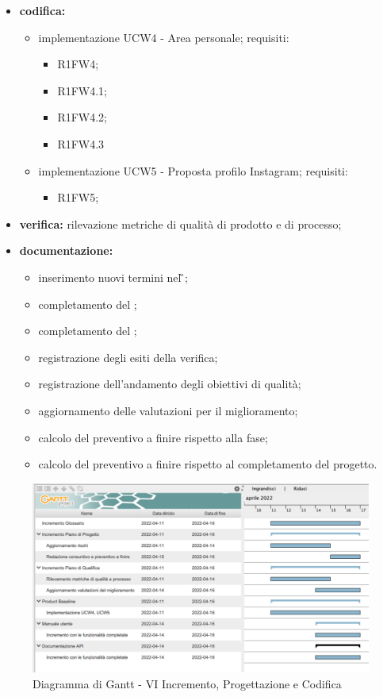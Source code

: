 \begin{itemize}
	\item \textbf{codifica:} 
			\begin{itemize}
				\item implementazione UCW4 - Area personale; requisiti:
					\begin{itemize}
						\item R1FW4;
      					\item R1FW4.1;
           				\item R1FW4.2;
               			\item R1FW4.3
					\end{itemize}
				\item implementazione UCW5 - Proposta profilo Instagram; requisiti:
					\begin{itemize}
						\item R1FW5;
					\end{itemize}
			\end{itemize}
 	\item \textbf{verifica:} rilevazione metriche di qualità di prodotto e di processo;
	\item \textbf{documentazione:} 
	 \begin{itemize}
		\item inserimento nuovi termini nel \G{};
		\item completamento del \MU{};
		\item completamento del \MS{};
  		\item registrazione degli esiti della verifica;
     	\item registrazione dell’andamento degli obiettivi di qualità;
		\item aggiornamento delle valutazioni per il miglioramento; 
		\item calcolo del preventivo a finire rispetto alla fase;
		\item calcolo del preventivo a finire rispetto al completamento del progetto.
	 \end{itemize}
\end{itemize}
\begin{figure}[H]
	\centering
	\includegraphics[scale=0.45]{Sezioni/gantt/VI_incremento.png}
	\caption{Diagramma di Gantt - VI Incremento, Progettazione e Codifica}
\end{figure}

